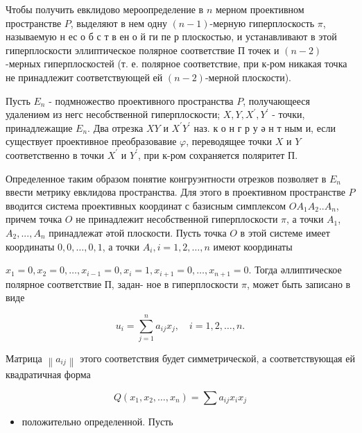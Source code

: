 \documentclass[10pt]{article}
\begin{document}
Чтобы получить евклидово мероопределение в $n$ мерном проективном пространстве $P$, выделяют в нем одну $(n-1)$-мерную гиперплоскость $\pi$, называемую н ес о б с т в ен о й ги пе р плоскостью, и устанавливают в этой гиперплоскости эллиптическое полярное соответствие П точек и $(n-2)$-мерных гиперплоскостей (т. е. полярное соответствие, при к-ром никакая точка не принадлежит соответствующей ей $(n-2)$-мерной плоскости).



Пусть $E_{n}$ - подмножество проективного пространства $P$, получающееся удалениөм из негс несобственной гиперплоскости; $X, Y, X^{\prime}, Y^{\prime}$ - точки, принадлежащие $E_{n}$. Два отрезка $X Y$ и $X^{\prime} Y^{\prime}$ наз. к о н г р у ә н т ным и, если существует проективное преобразовавие $\varphi$, переводящее точки $X$ и $Y$ соответственно в точки $X^{\prime}$ и $Y^{\prime}$, при к-ром сохраняется поляритет П.



Определенное таким образом понятие конгруэнтности отрезков позволяет в $E_{n}$ ввести метрику евклидова пространства. Для этого в проективном пространстве $P$ вводится система проективных координат с базисным симплексом $O A_{1} A_{2} . . A_{n}$, причем точка $O$ не принадлежит несобственной гиперплоскости $\pi$, а точки $A_{1}$, $A_{2}, . . ., A_{n}$ принадлежат әтой плоскости. Пусть точка $O$ в этой системе имеет координаты $0,0, \ldots, 0,1$, а точки $A_{i}, i=1,2, \ldots, n$ имеют координаты



$x_{1}=0, x_{2}=0, \ldots, x_{i-1}=0, x_{i}=1, x_{i+1}=0, \ldots, x_{n+1}=0$. Тогда әллиптическое полярное соответствие П, задан- ное в гиперплоскости $\pi$, может быть записано в виде



\[

u_{i}=\sum_{j=1}^{n} a_{i j} x_{j}, \quad i=1,2, \ldots, n .

\]



Матрица $\left\|a_{i j}\right\|$ этого соответствия будет симметрической, а соответствующая ей квадратичная форма



\[

Q\left(x_{1}, x_{2}, \ldots, x_{n}\right)=\sum a_{i j} x_{i} x_{j}

\]



\begin{itemize}

  \item положительно определенной. Пусть

\end{itemize}
\end{document}
